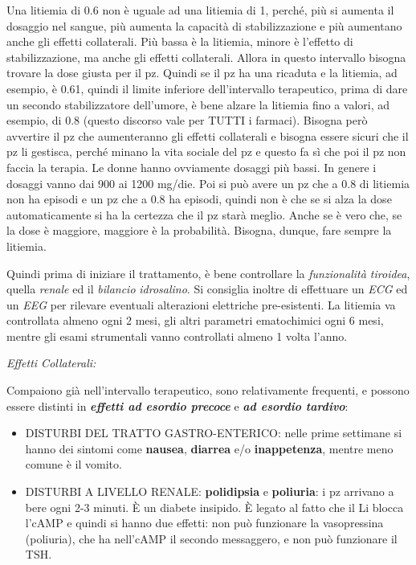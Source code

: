 \begin{itemize}
Una litiemia di 0.6 non è uguale ad una litiemia di 1, perché, più si
aumenta il dosaggio nel sangue, più aumenta la capacità di
stabilizzazione e più aumentano anche gli effetti collaterali. Più bassa
è la litiemia, minore è l'effetto di stabilizzazione, ma anche gli
effetti collaterali. Allora in questo intervallo bisogna trovare la dose
giusta per il pz. Quindi se il pz ha una ricaduta e la litiemia, ad
esempio, è 0.61, quindi il limite inferiore dell'intervallo terapeutico,
prima di dare un secondo stabilizzatore dell'umore, è bene alzare la
litiemia fino a valori, ad esempio, di 0.8 (questo discorso vale per
TUTTI i farmaci). Bisogna però avvertire il pz che aumenteranno gli
effetti collaterali e bisogna essere sicuri che il pz li gestisca,
perché minano la vita sociale del pz e questo fa sì che poi il pz non
faccia la terapia. Le donne hanno ovviamente dosaggi più bassi. In
genere i dosaggi vanno dai 900 ai 1200 mg/die. Poi si può avere un pz
che a 0.8 di litiemia non ha episodi e un pz che a 0.8 ha episodi,
quindi non è che se si alza la dose automaticamente si ha la certezza
che il pz starà meglio. Anche se è vero che, se la dose è maggiore,
maggiore è la probabilità. Bisogna, dunque, fare sempre la litiemia.

Quindi prima di iniziare il trattamento, è bene controllare la
\emph{funzionalità tiroidea}, quella \emph{renale} ed il \emph{bilancio}
\emph{idrosalino}. Si consiglia inoltre di effettuare un \emph{ECG} ed
un \emph{EEG} per rilevare eventuali alterazioni elettriche
pre-esistenti. La litiemia va controllata almeno ogni 2 mesi, gli altri
parametri ematochimici ogni 6 mesi, mentre gli esami strumentali vanno
controllati almeno 1 volta l'anno.

\emph{\emph{Effetti Collaterali:}}

Compaiono già nell'intervallo terapeutico, sono relativamente frequenti,
e possono essere distinti in \textbf{\emph{effetti ad esordio precoce}}
e \textbf{\emph{ad esordio tardivo}}:

\begin{itemize}
\item
  DISTURBI DEL TRATTO GASTRO-ENTERICO: nelle prime settimane si hanno
  dei sintomi come \textbf{nausea}, \textbf{diarrea} e/o
  \textbf{inappetenza}, mentre meno comune è il vomito.
\item
  DISTURBI A LIVELLO RENALE: \textbf{polidipsia} e \textbf{poliuria}: i
  pz arrivano a bere ogni 2-3 minuti. È un diabete insipido. È legato al
  fatto che il Li blocca l'cAMP e quindi si hanno due effetti: non può
  funzionare la vasopressina (poliuria), che ha nell'cAMP il secondo
  messaggero, e non può funzionare il TSH.


\end{itemize}
\end{itemize}
